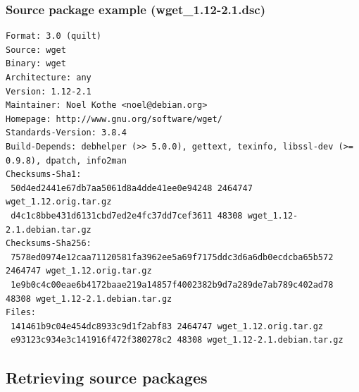 \documentclass[10pt,final]{beamer}
\newcommand{\br}{\vskip 1em}
\begin{document}
\begin{frame}[fragile]
	\frametitle{Source package example (wget\_1.12-2.1.dsc)}
\begin{lstlisting}[basicstyle=\ttfamily\small]
Format: 3.0 (quilt)
Source: wget
Binary: wget
Architecture: any
Version: 1.12-2.1
Maintainer: Noel Kothe <noel@debian.org>
Homepage: http://www.gnu.org/software/wget/
Standards-Version: 3.8.4
Build-Depends: debhelper (>> 5.0.0), gettext, texinfo, libssl-dev (>= 0.9.8), dpatch, info2man
Checksums-Sha1: 
 50d4ed2441e67db7aa5061d8a4dde41ee0e94248 2464747 wget_1.12.orig.tar.gz
 d4c1c8bbe431d6131cbd7ed2e4fc37dd7cef3611 48308 wget_1.12-2.1.debian.tar.gz
Checksums-Sha256: 
 7578ed0974e12caa71120581fa3962ee5a69f7175ddc3d6a6db0ecdcba65b572 2464747 wget_1.12.orig.tar.gz
 1e9b0c4c00eae6b4172baae219a14857f4002382b9d7a289de7ab789c402ad78 48308 wget_1.12-2.1.debian.tar.gz
Files: 
 141461b9c04e454dc8933c9d1f2abf83 2464747 wget_1.12.orig.tar.gz
 e93123c934e3c141916f472f380278c2 48308 wget_1.12-2.1.debian.tar.gz
\end{lstlisting}
\end{frame}

\subsection{Retrieving source packages}
\end{document}
